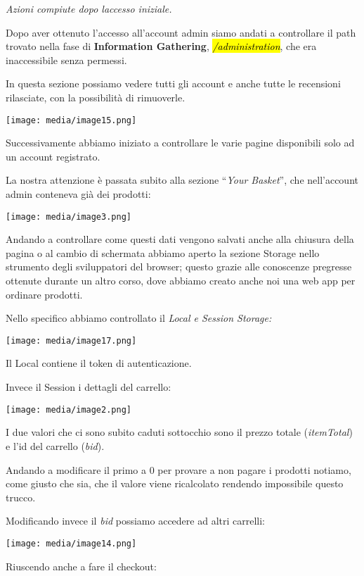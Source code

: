 \emph{Azioni compiute dopo l\textquotesingle accesso iniziale.}

Dopo aver ottenuto l'accesso all'account admin siamo andati a
controllare il path trovato nella fase di \textbf{Information
Gathering}, \emph{\hl{/administration}}, che era inaccessibile senza
permessi.

In questa sezione possiamo vedere tutti gli account e anche tutte le
recensioni rilasciate, con la possibilità di rimuoverle.

\texttt{[image: media/image15.png]}

Successivamente abbiamo iniziato a controllare le varie pagine
disponibili solo ad un account registrato.

La nostra attenzione è passata subito alla sezione ``\emph{Your
Basket}'', che nell'account admin conteneva già dei prodotti:

\texttt{[image: media/image3.png]}

Andando a controllare come questi dati vengono salvati anche alla
chiusura della pagina o al cambio di schermata abbiamo aperto la sezione
Storage nello strumento degli sviluppatori del browser; questo grazie
alle conoscenze pregresse ottenute durante un altro corso, dove abbiamo
creato anche noi una web app per ordinare prodotti.

Nello specifico abbiamo controllato il \emph{Local e Session Storage:}

\texttt{[image: media/image17.png]}

Il Local contiene il token di autenticazione.

Invece il Session i dettagli del carrello:

\texttt{[image: media/image2.png]}

I due valori che ci sono subito caduti sott\textquotesingle occhio sono
il prezzo totale (\emph{itemTotal}) e l'id del carrello (\emph{bid}).

Andando a modificare il primo a 0 per provare a non pagare i prodotti
notiamo, come giusto che sia, che il valore viene ricalcolato rendendo
impossibile questo trucco.

Modificando invece il \emph{bid} possiamo accedere ad altri carrelli:

\texttt{[image: media/image14.png]}

Riuscendo anche a fare il checkout:

